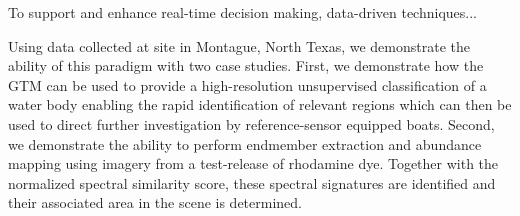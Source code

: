 \documentclass{article}
\begin{document}
To support and enhance real-time decision making, data-driven techniques...

Using data collected at site in Montague, North Texas, we demonstrate the ability of this paradigm with two case studies. First, we demonstrate how the GTM can be used to provide a high-resolution unsupervised classification of a water body enabling the rapid identification of relevant regions which can then be used to direct further investigation by reference-sensor equipped boats. Second, we demonstrate the ability to perform endmember extraction and abundance mapping using imagery from a test-release of rhodamine dye. Together with the normalized spectral similarity score, these spectral signatures are identified and their associated area in the scene is determined.






\end{document}
